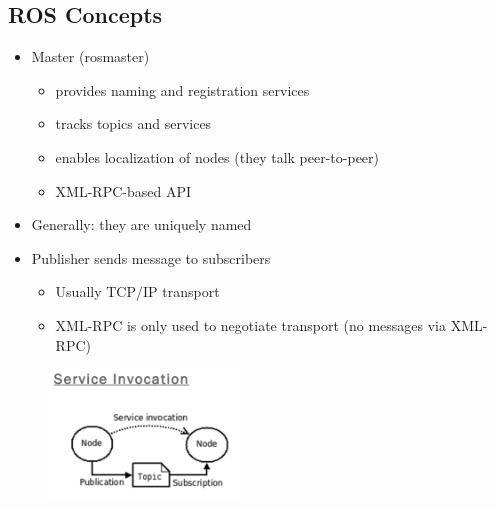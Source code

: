 \lyxframeend{}


\lyxframeend{}\subsection{ROS Concepts}


\lyxframeend{}
\begin{itemize}
\item Master (rosmaster)

\begin{itemize}
\item provides naming and registration services
\item tracks topics and services
\item enables localization of nodes (they talk peer-to-peer)
\item XML-RPC-based API
\end{itemize}
\item Generally: they are uniquely named
\end{itemize}

\lyxframeend{}


\lyxframeend{}
\begin{itemize}
\item Publisher sends message to subscribers

\begin{itemize}
\item Usually TCP/IP transport
\item XML-RPC is only used to negotiate transport (no messages via XML-RPC)
\end{itemize}
\end{itemize}
\noindent \begin{center}
\begin{figure}[H]
\noindent \centering{}\includegraphics[width=0.45\textwidth]{images/ServiceInvocation}
\end{figure}

\par\end{center}


